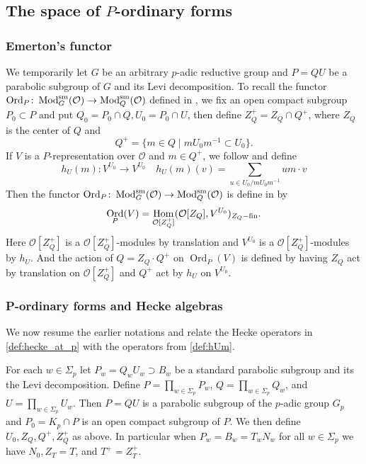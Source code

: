 \documentclass[leqno]{amsart}
\theoremstyle{definition}
\theoremstyle{remark}
\newcommand{\oo}{\mathcal{O}}
\DeclareMathOperator{\Hom}{Hom}
\DeclareMathOperator{\Mod}{\textnormal{Mod}}
\DeclareMathOperator{\Ord}{Ord} %
\newcommand{\sm}{\textnormal{sm}}
\begin{document}
\subsection{The space of $P$-ordinary forms}



\subsubsection{Emerton's functor}

We temporarily let $G$ be an arbitrary $p$-adic reductive group
and $P=QU$ be a parabolic subgroup of $G$ and its Levi decomposition.
To recall the functor 
$\Ord_P\colon \Mod_G^{\sm}(\oo)\to \Mod_Q^{\sm}(\oo)$
defined in \cite{emeI},
we fix an open compact subgroup $P_0\subset P$
and put $Q_0=P_0\cap Q, U_0=P_0\cap U$,
then define $Z_Q^+=Z_Q\cap Q^+$,
where $Z_Q$ is the center of $Q$ and
\[
	Q^+=\{m\in Q\mid mU_0m^{-1}\subset U_0\}.
\]
If  $V$ is a $P$-representation over $\oo$
and  $m\in Q^+$,
we follow \cite[Def 3.1.3]{emeI} and define
\begin{equation}\label{def:hUm}
	 h_{U}(m)\colon V^{U_0}\to V^{U_0}\quad
	 h_{U}(m)(v)=\sum_{u\in U_0/m U_0 m^{-1}}um\cdot v
\end{equation}
Then the functor
$\Ord_P\colon \Mod_G^{\sm}(\oo)\to \Mod_Q^{\sm}(\oo)$
is define in \cite[Def 3.1.3]{emeI} by
\begin{equation}\label{def:OrdP}
	\Ord_P(V)=\Hom_{\oo[Z_Q^+]}
    (\oo[Z_Q], V^{U_0})_{Z_Q-\textnormal{fin}}.
\end{equation}
Here $\oo[Z_Q^+]$ is a $\oo[Z_Q^+]$-modules by translation
and $V^{U_0}$ is a $\oo[Z_Q^+]$-modules by $h_U$.
And the action of $Q=Z_Q\cdot Q^+$ on $\Ord_P(V)$ is defined by 
having $Z_Q$ act by translation on $\oo[Z_Q^+]$ and 
$Q^+$ act by $h_U$ on $V^{U_0}$.


\subsubsection{P-ordinary forms and Hecke algebras}

We now resume the earlier notations and
relate the Hecke operators in \eqref{def:hecke_at_p}
with the operators from \eqref{def:hUm}.

For each  $w\in \Sigma_p$ let $P_w=Q_wU_w\supset B_w$ 
be a standard parabolic subgroup
and its the Levi decomposition.
Define 
$P=\prod_{w\in \Sigma_p}P_w$, $Q=\prod_{w\in \Sigma_p}Q_w$, and
$U=\prod_{w\in \Sigma_p}U_w$.
Then $P=QU$ is a parabolic subgroup
of the $p$-adic group $G_p$ and $P_0=K_p\cap P$
is an open compact subgroup of $P$.
We then define $U_0, Z_Q, Q^+, Z_Q^+$ as above.
In particular when $P_w=B_w=T_wN_w$ for all $w\in\Sigma_p$
we have $N_0, Z_T=T$, and $T^+=Z_T^+$.
\end{document}
